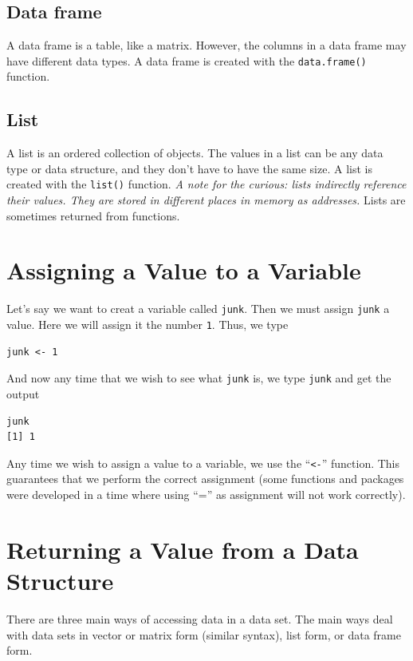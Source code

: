 \documentclass[11pt,letterpaper,fleqn]{report}
\begin{document}
\subsection{Data frame}
A data frame is a table, like a matrix. However, the columns in a data frame may have different data types. A data frame is created with the \texttt{data.frame()} function.

\subsection{List}
A list is an ordered collection of objects. The values in a list can be any data type or data structure, and they don't have to have the same size. A list is created with the \texttt{list()} function. \emph{A note for the curious: lists indirectly reference their values. They are stored in different places in memory as addresses.} Lists are sometimes returned from functions.

\section{Assigning a Value to a Variable}
Let's say we want to creat a variable called \texttt{junk}. Then we must assign \texttt{junk} a value. Here we will assign it the number \texttt{1}. Thus, we type 
\begin{verbatim}
junk <- 1
\end{verbatim}
And now any time that we wish to see what \texttt{junk} is, we type \texttt{junk} and get the output 
\begin{verbatim}
junk
[1] 1
\end{verbatim}
Any time we wish to assign a value to a variable, we use the ``\texttt{<-}'' function. This guarantees that we perform the correct assignment (some functions and packages were developed in a time where using ``='' as assignment will not work correctly).

\section{Returning a Value from a Data Structure}
There are three main ways of accessing data in a data set. The main ways deal with data sets in vector or matrix form (similar syntax), list form, or data frame form. 
\end{document}
